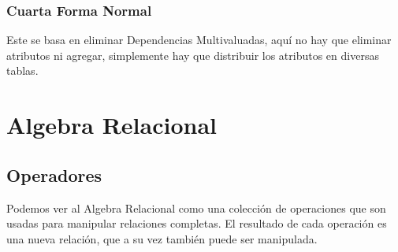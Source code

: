 \documentclass[12pt, fleqn]{report}                             %
\begin{document}
            


            \clearpage
            \subsection{Cuarta Forma Normal}

                Este se basa en eliminar Dependencias Multivaluadas, aquí no hay que
                eliminar atributos ni agregar, simplemente hay que distribuir los atributos
                en diversas tablas.




    \chapter{Algebra Relacional}


        \clearpage
        \section{Operadores}

            Podemos ver al Algebra Relacional como una colección de operaciones que
            son usadas para manipular relaciones completas. El resultado de cada
            operación es una nueva relación, que a su vez también puede ser manipulada.

















\end{document}

